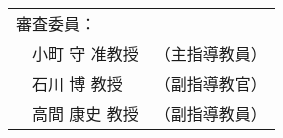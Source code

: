 \newpage
\thispagestyle{empty}
\vspace*{8cm}
\begin{center}


 \bigskip

 \jauthor
 \vspace*{0.4cm}
 \begin{table}[h]
 \begin{center}
	\begin{tabular}[t]{p{}ll}
	 \multicolumn{2}{l}{審査委員：} \\
	 & 小町 守 准教授 & （主指導教員） \\
	 & 石川 博 教授 & （副指導教官） \\
	 & 高間 康史 教授 & （副指導教員）
	\end{tabular}
 \end{center}
 \end{table}
 \end{center}
 
\newpage
